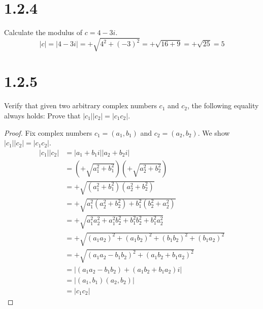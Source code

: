 \documentclass[11pt]{article}
\begin{document}

\section{1.2.4}
Calculate the modulus of $c = 4 - 3i$.
$$|c| = |4 - 3i| = +\sqrt{4^2 + (-3)^2} = +\sqrt{16 + 9} = +\sqrt{25} = 5$$


\newpage

\section{1.2.5}
Verify that given two arbitrary complex numbers $c_1$ and $c_2$, the following equality 
always holds: 
Prove that $|c_1||c_2| = |c_1 c_2|$.
\begin{proof}
	Fix complex numbers $c_1 = (a_1,b_1)$ and $c_2 = (a_2,b_2)$. We show $|c_1||c_2|=|c_1 c_2|$. 
	\begin{align*}
	|c_1||c_2| &= |a_1 + b_1i||a_2 + b_2i| \\
		   &= (+\sqrt{a_1^2 + b_1^2})(+\sqrt{a_2^2 + b_2^2}) \\
		   &= +\sqrt{(a_1^2 + b_1^2)(a_2^2 + b_2^2)}  \\
		   &= +\sqrt{a_1^2(a_2^2 + b_2^2) + b_1^2(b_2^2 + a_2^2)}  \\
		   &= +\sqrt{a_1^2a_2^2 + a_1^2b_2^2 + b_1^2b_2^2 + b_1^2a_2^2}  \\
		   &= +\sqrt{(a_1a_2)^2 + (a_1b_2)^2 + (b_1b_2)^2 + (b_1a_2)^2}  \\
		   &= +\sqrt{(a_1a_2 - b_1b_2)^2 + (a_1b_2 + b_1a_2)^2}  \\
		   &= |(a_1a_2 - b_1b_2) + (a_1b_2 + b_1a_2)i|  \\
		   &= |(a_1,b_1)(a_2,b_2)|  \\
		   &= |c_1c_2|
	\end{align*}
\end{proof}


\newpage
\end{document}
